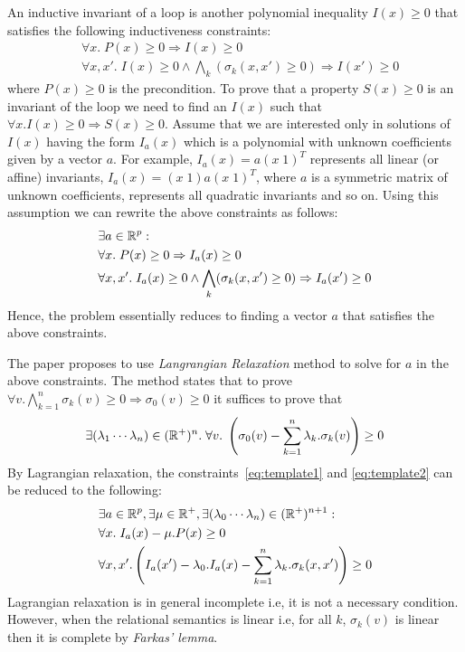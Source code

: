 An inductive invariant of a loop is another polynomial inequality $I(x) \ge 0$ 
that satisfies the following inductiveness constraints:
%
\begin{align}
& \forall x. \; P(x) \ge 0 \Rightarrow I(x) \ge 0 \\
& \forall x,x'.\; I(x) \ge 0 \wedge \bigwedge_k (\sigma_k(x,x') \ge 0) \Rightarrow  I(x') \ge 0
\end{align}
%
where $P(x) \ge 0$ is the precondition.
To prove that a property $S(x) \ge 0$ is an invariant of the loop we need to find an $I(x)$ such that
$\forall x. I(x) \ge 0 \Rightarrow S(x) \ge 0$.
Assume that we are interested only in solutions of $I(x)$ having the form $I_a(x)$ which is a polynomial with unknown coefficients given by a vector $a$. 
For example, $I_a(x) = a (x \; 1)^T$ represents all linear (or affine) invariants, 
$I_a(x) = (x \; 1) a (x \; 1)^T$, where $a$ is a symmetric matrix of unknown 
coefficients, represents all quadratic invariants  and so on. 
Using this assumption we can rewrite the above constraints as follows:
%
\begin{align}
& \nonumber \exists a \in \real^p:  \\
& \forall x. \; P(x) \ge 0 \Rightarrow I_a(x) \ge 0  \label{eq:template1}\\
& \forall x,x'. \; I_a(x) \ge 0  \wedge \bigwedge_k (\sigma_k(x,x') \ge 0) \Rightarrow  I_a(x') \ge 0 \label{eq:template2}
\end{align}
%
Hence,  the problem essentially reduces to finding a vector $a$ that satisfies
the above constraints.

The paper proposes to use \emph{Langrangian Relaxation} method to solve for $a$ in the above constraints. The method states that to prove 
$\forall v. \bigwedge \limits_{k=1}^{n} \sigma_k(v) \ge 0 \Rightarrow \sigma_0(v) \ge 0$ it suffices to prove that 
%
\begin{align}
\exists (\lambda_1 \cdots \lambda_n) \in (\real^+)^n. \; \forall v. \; \left( \sigma_0(v) -
\sum \limits_{k=1}^{n} \lambda_k. \sigma_k(v) \right) \ge 0 \label{eq:lagrange}
\end{align}
%
By Lagrangian relaxation, the constraints~\ref{eq:template1} and \ref{eq:template2}
can be reduced to the following:
%
\begin{align}
& \nonumber \exists a \in \real^p, \exists \mu \in \real^+, \exists (\lambda_0 \cdots \lambda_n) \in (\real^+)^{n+1}  : \\
&\forall x. \; I_a(x) - \mu.P(x)  \ge 0  \label{eq:inv1}\\
&\forall x,x'. \left( I_a(x') - \lambda_0.I_a(x) - \sum \limits_{k=1}^{n} \lambda_k. \sigma_k(x,x') \right)  \ge 0 \label{eq:inv2}
\end{align}
%
Lagrangian relaxation is in general incomplete i.e, it is not a necessary condition.
However, when the relational semantics is linear i.e, for all $k$, 
$\sigma_k(v)$ is linear then it is complete by \emph{Farkas' lemma}.

